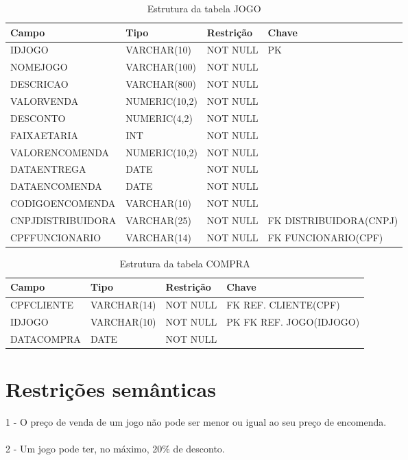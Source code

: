 \documentclass[11pt]{article}
\begin{document}
\begin{table}[H]
\centering
\caption{Estrutura da tabela JOGO}
\begin{tabular}{
    p{4.5cm}  %
    p{3cm}  %
    p{2cm}  %
    p{3cm}  %
}
\toprule
\textbf{Campo} & \textbf{Tipo} & \textbf{Restrição} & \textbf{Chave} \\
\midrule
IDJOGO & VARCHAR(10) & NOT NULL & PK\\
NOMEJOGO & VARCHAR(100) & NOT NULL\\
DESCRICAO & VARCHAR(800) & NOT NULL\\
VALORVENDA & NUMERIC(10,2) & NOT NULL\\
DESCONTO & NUMERIC(4,2) & NOT NULL\\
FAIXAETARIA & INT & NOT NULL\\
VALORENCOMENDA & NUMERIC(10,2) & NOT NULL\\
DATAENTREGA & DATE & NOT NULL \\
DATAENCOMENDA & DATE & NOT NULL\\
CODIGOENCOMENDA & VARCHAR(10) & NOT NULL\\
CNPJDISTRIBUIDORA & VARCHAR(25) & NOT NULL & FK DISTRIBUIDORA(CNPJ) \\
CPFFUNCIONARIO & VARCHAR(14) & NOT NULL & FK FUNCIONARIO(CPF) \\
\bottomrule
\end{tabular}
\end{table}

\begin{table}[H]
\centering
\caption{Estrutura da tabela COMPRA}
\begin{tabular}{
    p{4.5cm}  %
    p{3cm}  %
    p{2cm}  %
    p{3cm}  %
}
\toprule
\textbf{Campo} & \textbf{Tipo} & \textbf{Restrição} & \textbf{Chave} \\
\midrule
CPFCLIENTE & VARCHAR(14) & NOT NULL & FK REF. CLIENTE(CPF) \\
IDJOGO & VARCHAR(10) & NOT NULL & PK FK REF. JOGO(IDJOGO) \\
DATACOMPRA & DATE & NOT NULL\\
\bottomrule
\end{tabular}
\end{table}

\section{Restrições semânticas}
1 - O preço de venda de um jogo não pode ser menor ou igual ao seu preço de encomenda.\\\\
2 - Um jogo pode ter, no máximo, 20\% de desconto.
\end{document}
